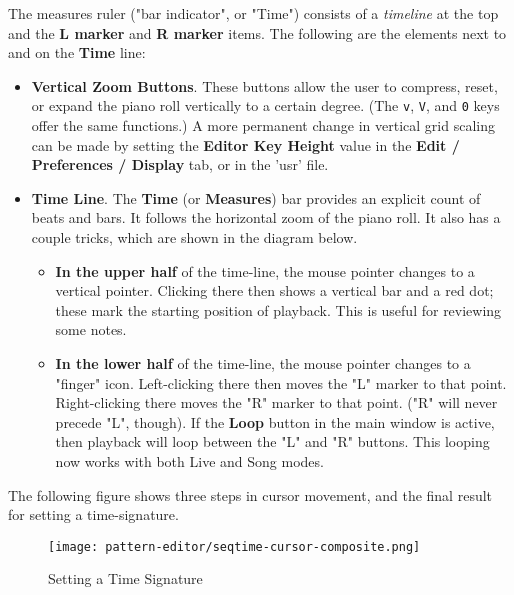    The measures ruler ("bar indicator", or "Time")
   consists of a \textsl{timeline} at the top and the 
   \textbf{L marker} and \textbf{R marker} items.
   The following are the elements next to and on
   the \textbf{Time} line:

   \begin{itemize}
      \item \textbf{Vertical Zoom Buttons}.
         These buttons allow the user to compress, reset, or expand the
         piano roll vertically to a certain degree.
         (The \texttt{v}, \texttt{V}, and \texttt{0} keys offer
         the same functions.)
         A more permanent change in vertical grid scaling
         can be made by setting the \textbf{Editor Key Height} value in
         the \textbf{Edit / Preferences / Display} tab,
         or in the 'usr' file.
      \item \textbf{Time Line}.
         The \textbf{Time} (or \textbf{Measures}) bar provides an explicit
         count of beats and bars.
         It follows the horizontal zoom of the piano roll.
         It also has a couple tricks, which are shown in the diagram below.
         \begin{itemize}
            \item \textbf{In the upper half} of the time-line,
               the mouse pointer changes to a vertical pointer.
               Clicking there then shows a vertical bar and a red dot; these mark
               the starting position of playback.
               This is useful for reviewing some notes.
            \item \textbf{In the lower half} of the time-line,
               the mouse pointer changes to a "finger" icon.
               Left-clicking there then moves the "L" marker to that point.
               Right-clicking there moves the "R" marker to that point.
               ("R" will never precede "L", though).
               If the \textbf{Loop} button in the main window is active, then
               playback will loop between the "L" and "R" buttons.
               This looping now works with both Live and Song modes.
         \end{itemize}
   \end{itemize}

   The following figure shows three steps in cursor movement, and the final
   result for setting a time-signature.

\begin{figure}[H]
   \centering 
   \texttt{[image: pattern-editor/seqtime-cursor-composite.png]}
   \caption{Setting a Time Signature}
   \label{fig:pattern_editor_seqtime_cursor_composite}
\end{figure}

